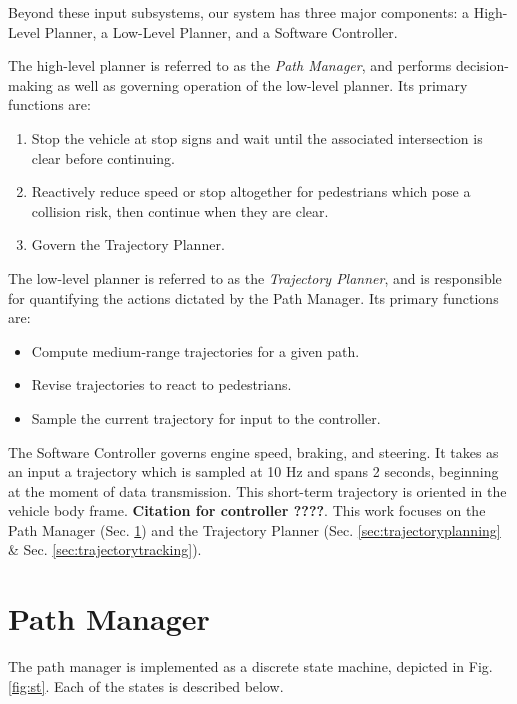 \documentclass[letterpaper, 10 pt, conference]{ieeeconf}  %
\begin{document}
Beyond these input subsystems, our system has three major components: a High-Level Planner, a Low-Level Planner, and a Software Controller.

The high-level planner is referred to as the {\it Path Manager}, and performs decision-making as well as governing operation of the low-level planner.
Its primary functions are:
\begin{enumerate}
  \item Stop the vehicle at stop signs and wait until the associated intersection is clear before continuing.
  \item Reactively reduce speed or stop altogether for pedestrians which pose a collision risk, then continue when they are clear.
  \item Govern the Trajectory Planner.
\end{enumerate}
The low-level planner is referred to as the {\it Trajectory Planner}, and is responsible for quantifying the actions dictated by the Path Manager.
Its primary functions are:
\begin{itemize}
  \item Compute medium-range trajectories for a given path.
  \item Revise trajectories to react to pedestrians.
  \item Sample the current trajectory for input to the controller.
\end{itemize}

The Software Controller governs engine speed, braking, and steering.
It takes as an input a trajectory which is sampled at 10 Hz and spans 2 seconds, beginning at the moment of data transmission.
This short-term trajectory is oriented in the vehicle body frame.
\textbf{Citation for controller ????}.
This work focuses on the Path Manager (Sec. \ref{sec:pathmanager}) and the Trajectory Planner (Sec. \ref{sec:trajectoryplanning} \& Sec. \ref{sec:trajectorytracking}).



\section{Path Manager} \label{sec:pathmanager}

The path manager is implemented as a discrete state machine, depicted in Fig. \ref{fig:st}.
Each of the states is described below.
\end{document}
